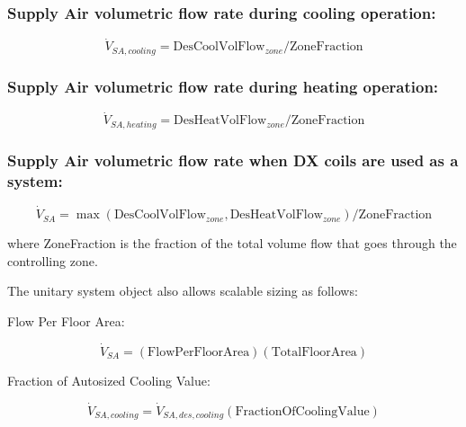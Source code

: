 \subsubsection{Supply Air volumetric flow rate during cooling operation:}\label{supply-air-volumetric-flow-rate-during-cooling-operation-1}

\begin{equation}
\dot V_{SA,cooling} = \text{DesCoolVolFlow}_{zone} / \text{ZoneFraction}
\end{equation}

\subsubsection{Supply Air volumetric flow rate during heating operation:}\label{supply-air-volumetric-flow-rate-during-heating-operation-1}

\begin{equation}
\dot V_{SA,heating} = \text{DesHeatVolFlow}_{zone} / \text{ZoneFraction}
\end{equation}

\subsubsection{Supply Air volumetric flow rate when DX coils are used as a system:}\label{supply-air-volumetric-flow-rate-when-dx-coils-are-used-as-a-system}

\begin{equation}
\dot V_{SA} = \max \left(\text{DesCoolVolFlow}_{zone}, \text{DesHeatVolFlow}_{zone}\right) / \text{ZoneFraction}
\end{equation}

where ZoneFraction is the fraction of the total volume flow that goes through the controlling zone.

The unitary system object also allows scalable sizing as follows:

Flow Per Floor Area:

\begin{equation}
\dot V_{SA} = \left(\text{FlowPerFloorArea}\right)\left(\text{TotalFloorArea}\right)
\end{equation}

Fraction of Autosized Cooling Value:

\begin{equation}
\dot V_{SA,cooling} = \dot V_{SA,des,cooling}\left(\text{FractionOfCoolingValue}\right)
\end{equation}

